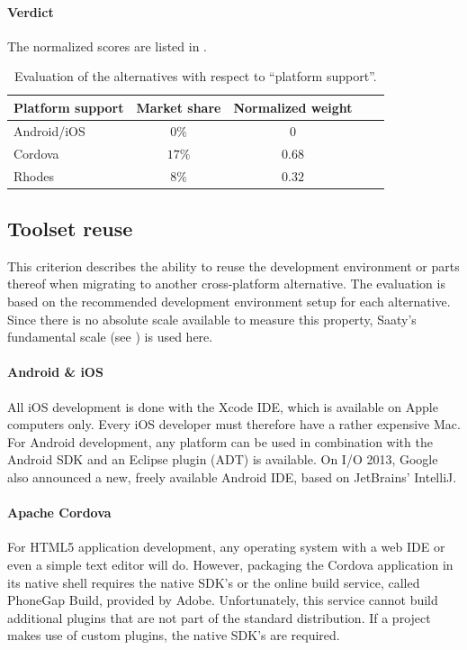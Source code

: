 \paragraph{Verdict} The normalized scores are listed in . 

\begin{table}[h!]
    \begin{center}
        \begin{tabular}{lcccl}
            \hline
            \textbf{Platform support} & Market share & Normalized weight \\
            \hline
            Android/iOS               & $0\%$        & $0$         \\
            Cordova                   & $17\%$       & $0.68$      \\
            Rhodes                    & $8\%$        & $0.32$      \\
            \hline
        \end{tabular}
        \caption{Evaluation of the alternatives with respect to ``platform support''.}
        \label{tab:ps}
    \end{center}
\end{table}

\subsection{Toolset reuse}

This criterion describes the ability to reuse the development environment or parts thereof when migrating to another cross-platform alternative. The evaluation is based on the recommended development environment setup for each alternative. Since there is no absolute scale available to measure this property, Saaty's fundamental scale (see ) is used here.

\paragraph{Android \& iOS} All iOS development is done with the Xcode IDE, which is available on Apple computers only. Every iOS developer must therefore have a rather expensive Mac. For Android development, any platform can be used in combination with the Android SDK and an Eclipse plugin (ADT) is available. On I/O 2013, Google also announced a new, freely available Android IDE, based on JetBrains' IntelliJ.

\paragraph{Apache Cordova} For HTML5 application development, any operating system with a web IDE or even a simple text editor will do. However, packaging the Cordova application in its native shell requires the native SDK's or the online build service, called PhoneGap Build, provided by Adobe. Unfortunately, this service cannot build additional plugins that are not part of the standard distribution. If a project makes use of custom plugins, the native SDK's are required. 


